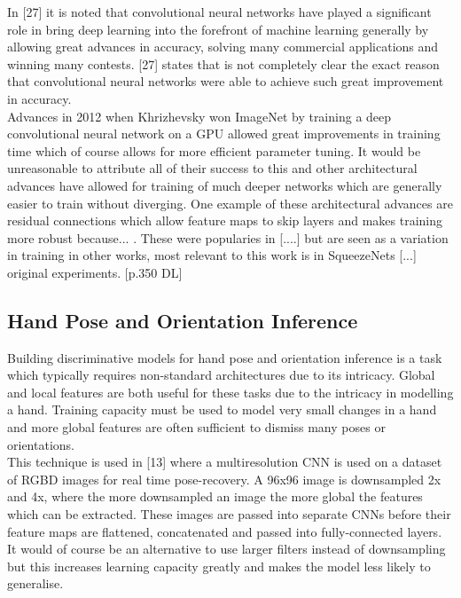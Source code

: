 \documentclass{article}
\begin{document}
In [27] it is noted that convolutional neural networks have played a significant role in bring deep learning into the forefront of machine learning generally by allowing great advances in accuracy, solving many commercial applications and winning many contests. [27] states that is not completely clear the exact reason that convolutional neural networks were able to achieve such great improvement in accuracy.\\ 

Advances in 2012 when Khrizhevsky won ImageNet by training a deep convolutional neural network on a GPU allowed great improvements in training time which of course allows for more efficient parameter tuning. It would be unreasonable to attribute all of their success to this and other architectural advances have allowed for training of much deeper networks which are generally easier to train without diverging. One example of these architectural advances are residual connections which allow feature maps to skip layers and makes training more robust because... . These were popularies in [....] but are seen as a variation in training in other works, most relevant to this work is in SqueezeNets [...] original experiments.
[p.350 DL]

\subsection*{Hand Pose and Orientation Inference}
Building discriminative models for hand pose and orientation inference is a task which typically requires non-standard architectures due to its intricacy. Global and local features are both useful for these tasks due to the intricacy in modelling a hand. Training capacity must be used to model very small changes in a hand and more global features are often sufficient to dismiss many poses or orientations.\\

This technique is used in [13] where a multiresolution CNN is used on a dataset of RGBD images for real time pose-recovery. A 96x96 image is downsampled 2x and 4x, where the more downsampled an image the more global the features which can be extracted. These images are passed into separate CNNs before their feature maps are flattened, concatenated and passed into fully-connected layers. It would of course be an alternative to use larger filters instead of downsampling but this increases learning capacity greatly and makes the model less likely to generalise.\\
\end{document}
